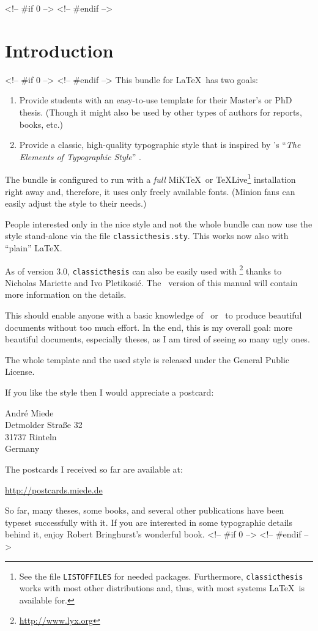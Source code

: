 <!-- #if 0 -->
<!-- #endif -->
\chapter{Introduction}\label{ch:introduction}
<!-- #if 0 -->
<!-- #endif -->
This bundle for \LaTeX\ has two goals:
\begin{enumerate}
    \item Provide students with an easy-to-use template for their
    Master's
    or PhD thesis. (Though it might also be used by other types of
    authors
    for reports, books, etc.)
    \item Provide a classic, high-quality typographic style that is
    inspired by \citeauthor{bringhurst:2002}'s ``\emph{The Elements of
    Typographic Style}'' \citep{bringhurst:2002}.
    \marginpar{\myTitle \myVersion}
\end{enumerate}
The bundle is configured to run with a \emph{full}
MiK\TeX\ or \TeX Live\footnote{See the file \texttt{LISTOFFILES} for
needed packages. Furthermore, \texttt{classicthesis}
works with most other distributions and, thus, with most systems
\LaTeX\ is available for.}
installation right away and, therefore, it uses only freely available
fonts. (Minion fans can easily adjust the style to their needs.)

People interested only in the nice style and not the whole bundle can
now use the style stand-alone via the file \texttt{classicthesis.sty}.
This works now also with “plain” \LaTeX.

As of version 3.0, \texttt{classicthesis} can also be easily used with
\mLyX\footnote{\url{http://www.lyx.org}} thanks to Nicholas Mariette
and Ivo Pletikosić. The \mLyX\ version of this manual will contain
more information on the details.

This should enable anyone with a basic knowledge of \LaTeXe\ or \mLyX\ to
produce beautiful documents without too much effort. In the end, this
is my overall goal: more beautiful documents, especially theses, as I
am tired of seeing so many ugly ones.

The whole template and the used style is released under the
 General Public License.

If you like the style then I would appreciate a postcard:
\begin{center}
    André Miede \\
    Detmolder Straße 32 \\
    31737 Rinteln \\
    Germany
\end{center}
The postcards I received so far are available at:
\begin{center}
    \url{http://postcards.miede.de}
\end{center}
So far, many theses, some books, and several other publications have
been typeset successfully with it. If you are interested in some
typographic details behind it, enjoy Robert Bringhurst's wonderful book.
<!-- #if 0 -->
<!-- #endif -->

